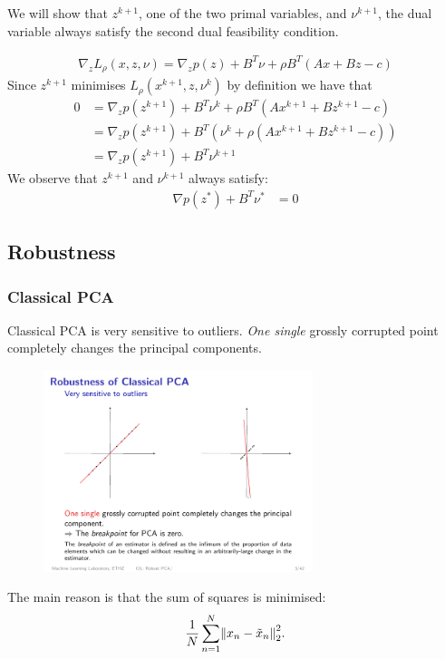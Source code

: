 We will show that $z^{k+1}$, one of the two primal variables, and $\nu^{k+1}$, the dual variable always satisfy the second dual feasibility condition.

\begin{align*}
    \nabla_z L_\rho (x,z,\nu) = \nabla_z p(z) + B^T \nu +\rho B^T(Ax+Bz-c)
\end{align*}
Since $z^{k+1}$ minimises $L_\rho (x^{k+1},z,\nu^k)$ by definition we have that
\begin{align*}
     0 &= \nabla_z p(z^{k+1}) + B^T \nu^k +\rho B^T (Ax^{k+1}+Bz^{k+1}-c)\\ 
     &= \nabla_z p(z^{k+1}) + B^T(\nu^k+\rho (Ax^{k+1}+Bz^{k+1}-c))\\
     &= \nabla_z p(z^{k+1}) + B^T \nu^{k+1}
\end{align*}
We observe that $z^{k+1}$ and $\nu^{k+1}$ always satisfy:
\begin{align*}
        \nabla p(z^*) +B^T \nu^* &= 0
\end{align*}

\subsection{Robustness}
\subsubsection{Classical PCA}
Classical PCA is very sensitive to outliers. \emph{One single} grossly corrupted point completely changes the principal components.
\begin{figure}[H]
    \centering
    \includegraphics[width=0.7\textwidth]{img/12_pca_robustness}
\end{figure}

The main reason is that the sum of squares is minimised:
\begin{align*}
    {1\over N} \sum_{n=1}^N \norm{x_n-\tilde x_n}_2^2.
\end{align*}

